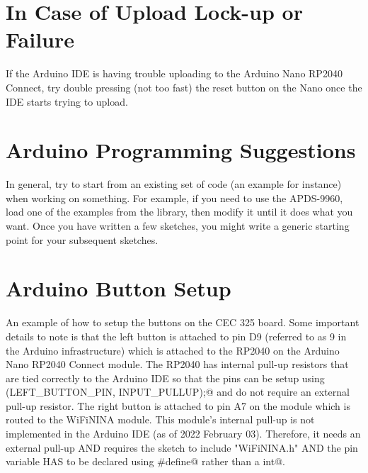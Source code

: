 \section{In Case of Upload Lock-up or Failure}
If the Arduino IDE is having trouble uploading to the Arduino Nano RP2040 Connect, try double pressing
(not too fast) the reset button on the Nano once the IDE starts trying to upload.

\section{Arduino Programming Suggestions}
In general, try to start from an existing set of code (an example for instance) when working on something.
For example, if you need to use the APDS-9960, load one of the examples from the library, then modify it
until it does what you want. Once you have written a few sketches, you might write a generic starting point
for your subsequent sketches.

\section{Arduino Button Setup}
An example of how to setup the buttons on the CEC 325 board. Some important details to note is that the left button 
is attached to pin D9 (referred to as 9 in the Arduino infrastructure) which is attached to the RP2040 on the
Arduino Nano RP2040 Connect module. The RP2040 has internal pull-up resistors that are tied correctly to the 
Arduino IDE so that the pins can be setup using \lstinline@pinMode(LEFT_BUTTON_PIN, INPUT_PULLUP);@ and do not
require an external pull-up resistor. The right button is attached to pin A7 on the module which is routed to the
WiFiNINA module. This module's internal pull-up is not implemented in the Arduino IDE (as of 2022 February 03). 
Therefore, it needs an external pull-up AND requires the sketch to include "WiFiNINA.h" AND the pin variable 
HAS to be declared using \lstinline@#define@ rather than a \lstinline@const int@.

